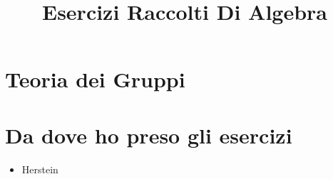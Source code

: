 \documentclass[a4paper,NoNotes,GeneralMath]{stdmdoc}
\begin{document}
	\title{Esercizi Raccolti Di Algebra}
	
	\section*{Teoria dei Gruppi}
	

	\section*{Da dove ho preso gli esercizi}
	\begin{itemize}
		\item Herstein
	\end{itemize}
\end{document}
